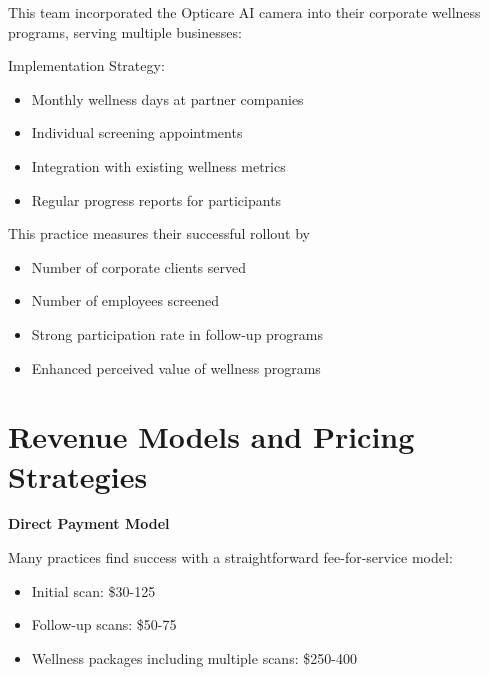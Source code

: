 \documentclass[
  Letterpaper,
]{scrbook}
\providecommand{\tightlist}{%
  \setlength{\itemsep}{0pt}\setlength{\parskip}{0pt}}\usepackage{longtable,booktabs,array}
\begin{document}
\begin{tcolorbox}[enhanced jigsaw, opacityback=0, titlerule=0mm, toptitle=1mm, breakable, arc=.35mm, colframe=quarto-callout-note-color-frame, coltitle=black, colbacktitle=quarto-callout-note-color!10!white, bottomtitle=1mm, rightrule=.15mm, leftrule=.75mm, title=\textcolor{quarto-callout-note-color}{\faInfo}\hspace{0.5em}{Case Study 2: Corporate Wellness Program}, bottomrule=.15mm, colback=white, toprule=.15mm, opacitybacktitle=0.6, left=2mm]

This team incorporated the Opticare AI camera into their corporate
wellness programs, serving multiple businesses:

Implementation Strategy:

\begin{itemize}
\tightlist
\item
  Monthly wellness days at partner companies
\item
  Individual screening appointments
\item
  Integration with existing wellness metrics
\item
  Regular progress reports for participants
\end{itemize}

This practice measures their successful rollout by

\begin{itemize}
\tightlist
\item
  Number of corporate clients served
\item
  Number of employees screened
\item
  Strong participation rate in follow-up programs
\item
  Enhanced perceived value of wellness programs
\end{itemize}

\end{tcolorbox}

\section{Revenue Models and Pricing
Strategies}\label{revenue-models-and-pricing-strategies}

\textbf{Direct Payment Model}

Many practices find success with a straightforward fee-for-service
model:

\begin{itemize}
\tightlist
\item
  Initial scan: \$30-125
\item
  Follow-up scans: \$50-75
\item
  Wellness packages including multiple scans: \$250-400
\end{itemize}
\end{document}
